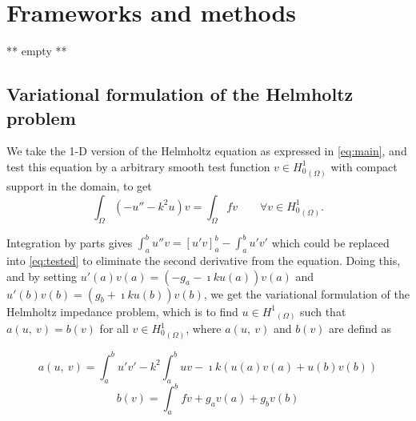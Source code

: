 \section{Frameworks and methods}\label{sec:frameworks}
** empty **

\subsection{Variational formulation of the Helmholtz problem}\label{sec:variational}

We take the 1-D version of the Helmholtz equation as expressed in \autoref{eq:main}, and test this equation by a
arbitrary smooth test function $v \in {H_{0}^{1} }_{(\Omega)}$ with compact support in the domain, to get
\begin{equation}
    \label{eq:tested}
    \int_{\Omega}{{(-u'' - k^2u)}v} = \int_{\Omega}{fv} \qquad \forall v \in {H_{0}^{1} }_{(\Omega)}.
\end{equation}

Integration by parts gives $\int_{a}^{b}{u''v} = [u'v]_{a}^{b} - \int_{a}^{b}{u'v'}$ which could be
replaced into \autoref{eq:tested} to eliminate the second derivative from the equation. Doing this, and by setting
$u'(a)v(a) = (-g_a-\imath ku(a))v(a)$ and $u'(b)v(b) = (g_b+\imath ku(b))v(b)$, we get the variational formulation
of the Helmholtz impedance problem, which is to find $u \in {H^{1} }_{(\Omega)}$ such that $a(u,\:v) = b(v)$ for all
$v \in {H_{0}^{1} }_{(\Omega)}$, where $a(u,\:v)$ and $b(v)$ are defind as

\begin{equation}
    \label{eq:varlhs}
    a(u,\:v) = \int_{a}^{b}{u'v'} - k^2 \int_{a}^{b}{uv} - \imath k (u(a)v(a) + u(b)v(b))
\end{equation}
\begin{equation}
    \label{eq:varrhs}
    b(v) = \int_{a}^{b}{fv} + g_a v(a) + g_b v(b)
\end{equation}

